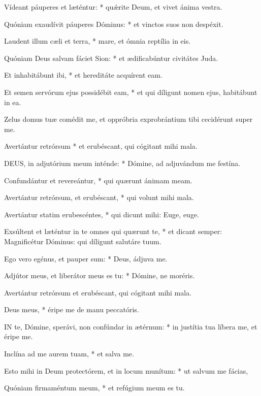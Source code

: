 Vídeant páuperes et læténtur: * quǽrite Deum, et vivet ánima vestra.

Quóniam exaudívit páuperes Dóminus: * et vinctos suos non despéxit.

Laudent illum cæli et terra, * mare, et ómnia reptília in eis.

Quóniam Deus salvam fáciet Sion: * et ædificabúntur civitátes Juda.

Et inhabitábunt ibi, * et hereditáte acquírent eam.

Et semen servórum ejus possidébit eam, * et qui díligunt nomen ejus, habitábunt in ea.


 Zelus domus tuæ comédit me, et oppróbria exprobrántium tibi cecidérunt super me.

 Avertántur retrórsum * et erubéscant, qui cógitant mihi mala.


\lettrine[lines=2]{D}{EUS}, in adjutórium meum inténde: * Dómine, ad adjuvándum me festína.

Confundántur et revereántur, * qui quærunt ánimam meam.

Avertántur retrórsum, et erubéscant, * qui volunt mihi mala.

Avertántur statim erubescéntes, * qui dicunt mihi: Euge, euge.

Exsúltent et læténtur in te omnes qui quærunt te, * et dicant semper: Magnificétur Dóminus: qui díligunt salutáre tuum.

Ego vero egénus, et pauper sum: * Deus, ádjuva me.

Adjútor meus, et liberátor meus es tu: * Dómine, ne moréris.

\rubric{\textdagger}

 Avertántur retrórsum et erubéscant, qui cógitant mihi mala.

 Deus meus, * éripe me de manu peccatóris.


\lettrine[lines=2]{I}{N} te, Dómine, sperávi, non confúndar in ætérnum: * in justítia tua líbera me, et éripe me.

Inclína ad me aurem tuam, * et salva me.

Esto mihi in Deum protectórem, et in locum munítum: * ut salvum me fácias,

Quóniam firmaméntum meum, * et refúgium meum es tu.

